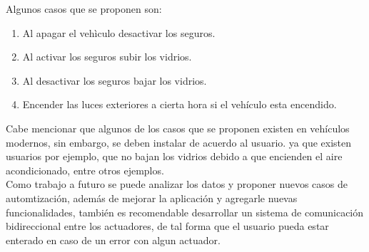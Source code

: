 Algunos casos que se proponen son:\\
\begin{enumerate}
\item Al apagar el vehìculo desactivar los seguros.
\item Al activar los seguros subir los vidrios.
\item Al desactivar los seguros bajar los vidrios.
\item Encender las luces exteriores a cierta hora si el vehículo esta encendido.
\end{enumerate}

Cabe mencionar que algunos de los casos que se proponen existen en vehículos modernos, sin embargo, se deben instalar de acuerdo al usuario. ya que existen usuarios por ejemplo, que no bajan los vidrios debido a que encienden el aire acondicionado, entre otros ejemplos.\\

Como trabajo a futuro se puede analizar los datos y proponer nuevos casos de automtización, además de mejorar la aplicación y agregarle nuevas funcionalidades, también es recomendable desarrollar un sistema de comunicación bidireccional entre los actuadores, de tal forma que el usuario pueda estar enterado en caso de un error con algun actuador.

